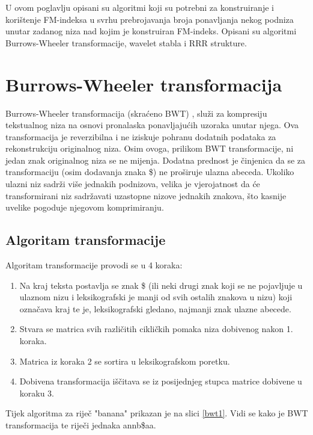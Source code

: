 U ovom poglavlju opisani su algoritmi koji su potrebni za konstruiranje i korištenje FM-indeksa u svrhu prebrojavanja broja ponavljanja nekog podniza unutar zadanog niza nad kojim je konstruiran FM-indeks. Opisani su algoritmi Burrows-Wheeler transformacije, wavelet stabla i RRR strukture.


\section{Burrows-Wheeler transformacija}
Burrows-Wheeler transformacija (skraćeno BWT) \cite{bwt1}, služi za kompresiju tekstualnog niza na osnovi pronalaska ponavljajućih uzoraka unutar njega. Ova transformacija je reverzibilna i ne iziskuje pohranu dodatnih podataka za rekonstrukciju originalnog niza. Osim ovoga, prilikom BWT transformacije, ni jedan znak originalnog niza se ne mijenja. Dodatna prednost je činjenica da se za transformaciju (osim dodavanja znaka \$) ne proširuje ulazna abeceda. Ukoliko ulazni niz sadrži više jednakih podnizova, velika je vjerojatnost da će transformirani niz sadržavati uzastopne nizove jednakih znakova, što kasnije uvelike pogoduje njegovom komprimiranju.

\subsection{Algoritam transformacije}
Algoritam transformacije provodi se u 4 koraka:

\begin{enumerate}
  \item Na kraj teksta postavlja se znak \$ (ili neki drugi znak koji se ne pojavljuje u ulaznom nizu i leksikografski je manji od svih ostalih znakova u nizu) koji označava kraj te je, leksikografski gledano, najmanji znak ulazne abecede.
  \item Stvara se matrica svih različitih cikličkih pomaka niza dobivenog nakon 1. koraka.
  \item Matrica iz koraka 2 se sortira u leksikografskom poretku.
  \item Dobivena transformacija iščitava se iz posijednjeg stupca matrice dobivene u koraku 3.

\end{enumerate}

Tijek algoritma za riječ "banana" prikazan je na slici \ref{bwt1}. Vidi se kako je BWT transformacija te riječi jednaka annb\$aa. 


